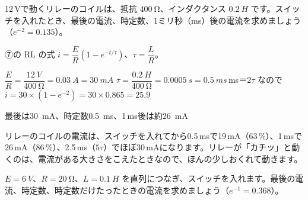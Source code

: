 \begin{reidai}[RL の電流]
12\,Vで動くリレーのコイルは、抵抗 $\qty{400}{\ohm}$、インダクタンス $\qty{0.2}{H}$ です。スイッチを入れたとき、最後の電流、時定数、1ミリ秒（ms）後の電流を求めましょう（$e^{-2}=0.135$）。\par
\kangaekata ⑦の RL の式 $i=\dfrac{E}{R}(1-e^{-t/\tau})$、$\tau=\dfrac{L}{R}$。\par
\shiki $\dfrac{E}{R}=\dfrac{\qty{12}{V}}{\qty{400}{\ohm}}=\qty{0.03}{A}=\qty{30}{mA}$\bkvieq
$\tau=\dfrac{\qty{0.2}{H}}{\qty{400}{\ohm}}=\qty{0.0005}{s}=\qty{0.5}{ms}$\,ms＝$2\tau$ なので $i=30\times(1-e^{-2})=30\times0.865=25.9$\par
\kotae 最後は\qty{30}{mA}、時定数\qty{0.5}{ms}、1\,ms後は約\qty{26}{mA}
\end{reidai}
\noindent\begin{minipage}[c]{0.5\linewidth}
\end{minipage}\hfill
\begin{minipage}[c]{0.46\linewidth}\raggedright
リレーのコイルの電流は、スイッチを入れてから0.5\,msで19\,mA（63\,\%）、1\,msで26\,mA（86\,\%）、2.5\,ms（$5\tau$）でほぼ30\,mAになります。リレーが「カチッ」と動くのは、電流がある大きさをこえたときなので、ほんの少しおくれて動きます。
\end{minipage}
\par\vspace{4pt}

\begin{jibun}
$E=\qty{6}{V}$、$R=\qty{20}{\ohm}$、$L=\qty{0.1}{H}$ を直列につなぎ、スイッチを入れます。最後の電流、時定数、時定数だけたったときの電流を求めましょう（$e^{-1}=0.368$）。
\end{jibun}

